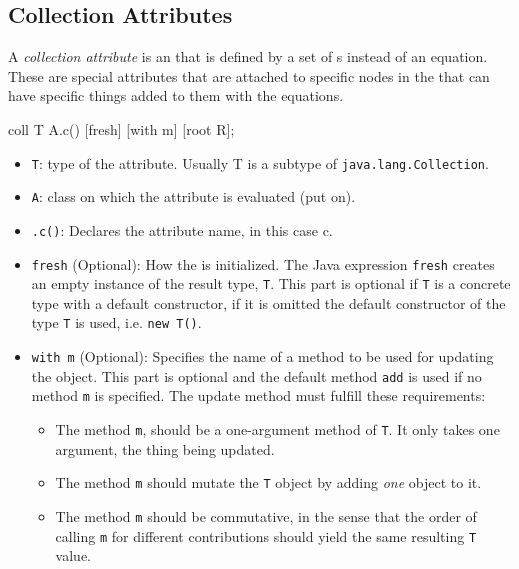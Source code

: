 \subsection{Collection Attributes}\label{subsec:Collection_Attributes}
\begin{definition}\label{def:Collection_Attribute}
  A \emph{collection attribute} is an  that is defined by a set of s instead of an equation.
  These are special attributes that are attached to specific nodes in the  that can have specific things added to them with the  equations.
\begin{javasource}
  coll T A.c() [fresh]
    [with m]
    [root R];
\end{javasource}
  \begin{itemize}[noitemsep]
  \item \texttt{T}: type of the attribute. Usually T is a subtype of \texttt{java.lang.Collection}.
  \item \texttt{A}:  class on which the attribute is evaluated (put on).
  \item \texttt{.c()}: Declares the attribute name, in this case c.
  \item \texttt{fresh} (Optional): How the  is initialized.
    The Java expression \texttt{fresh} creates an empty instance of the result type, \texttt{T}.
    This part is optional if \texttt{T} is a concrete type with a default constructor, if it is omitted the default constructor of the type \texttt{T} is used, i.e. \texttt{new T()}.
  \item \texttt{with m} (Optional): Specifies the name of a method to be used for updating the  object.
    This part is optional and the default method \texttt{add} is used if no method \texttt{m} is specified.
    The update method must fulfill these requirements:
    \begin{itemize}[noitemsep]
    \item The method \texttt{m}, should be a one-argument method of \texttt{T}. It only takes one argument, the thing being updated.
    \item The method \texttt{m} should mutate the \texttt{T} object by adding \emph{one} object to it.
    \item The method \texttt{m} should be commutative, in the sense that the order of calling \texttt{m} for different contributions should yield the same resulting \texttt{T} value.

\end{itemize}
\end{itemize}
\end{definition}
